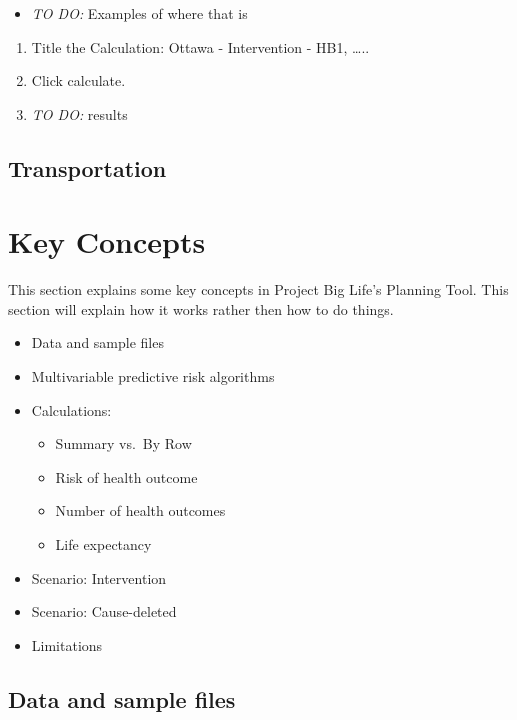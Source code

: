\documentclass[]{book}
\providecommand{\tightlist}{%
  \setlength{\itemsep}{0pt}\setlength{\parskip}{0pt}}
\begin{document}
\begin{itemize}
\tightlist
\item
  \emph{TO DO: } Examples of where that is
\end{itemize}

\begin{enumerate}
\def\labelenumi{\arabic{enumi}.}
\setcounter{enumi}{5}
\item
  Title the Calculation: Ottawa - Intervention - HB1, \ldots{}..
\item
  Click calculate.
\item
  \emph{TO DO:} results
\end{enumerate}

\section{Transportation}\label{transportation}

\chapter{Key Concepts}\label{keyconcepts}

This section explains some key concepts in Project Big Life's Planning
Tool. This section will explain how it works rather then how to do
things.

\begin{itemize}
\item
  Data and sample files
\item
  Multivariable predictive risk algorithms
\item
  Calculations:

  \begin{itemize}
  \tightlist
  \item
    Summary vs.~By Row
  \item
    Risk of health outcome
  \item
    Number of health outcomes
  \item
    Life expectancy
  \end{itemize}
\item
  Scenario: Intervention
\item
  Scenario: Cause-deleted
\item
  Limitations
\end{itemize}

\section{Data and sample files}\label{data-and-sample-files}
\end{document}
